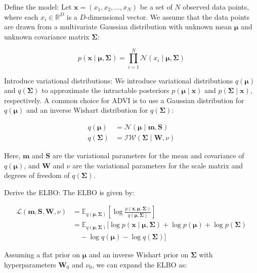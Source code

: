 \documentclass[11pt]{article}
\begin{document}
    Define the model: Let $\mathbf{x} = (x_1, x_2, \ldots, x_N)$ be a set of $N$ observed data points, where each $x_i \in \mathbb{R}^D$ is a $D$-dimensional vector. We assume that the data points are drawn from a multivariate Gaussian distribution with unknown mean $\boldsymbol{\mu}$ and unknown covariance matrix $\boldsymbol{\Sigma}$:

    $$
    p(\mathbf{x} \mid \boldsymbol{\mu}, \boldsymbol{\Sigma}) = \prod_{i=1}^N \mathcal{N}(x_i \mid \boldsymbol{\mu}, \boldsymbol{\Sigma})
    $$

    Introduce variational distributions: We introduce variational distributions $q(\boldsymbol{\mu})$ and $q(\boldsymbol{\Sigma})$ to approximate the intractable posteriors $p(\boldsymbol{\mu} \mid \mathbf{x})$ and $p(\boldsymbol{\Sigma} \mid \mathbf{x})$, respectively. A common choice for ADVI is to use a Gaussian distribution for $q(\boldsymbol{\mu})$ and an inverse Wishart distribution for $q(\boldsymbol{\Sigma})$:

    \begin{align*}
        q(\boldsymbol{\mu}) &= \mathcal{N}(\boldsymbol{\mu} \mid \boldsymbol{m}, \boldsymbol{S}) \\
        q(\boldsymbol{\Sigma}) &= \mathcal{IW}(\boldsymbol{\Sigma} \mid \boldsymbol{W}, \nu)
    \end{align*}

    Here, $\boldsymbol{m}$ and $\boldsymbol{S}$ are the variational parameters for the mean and covariance of $q(\boldsymbol{\mu})$, and $\boldsymbol{W}$ and $\nu$ are the variational parameters for the scale matrix and degrees of freedom of $q(\boldsymbol{\Sigma})$.

    Derive the ELBO: The ELBO is given by:

    \begin{align*}
        \mathcal{L}(\boldsymbol{m}, \boldsymbol{S}, \boldsymbol{W}, \nu) &= \mathbb{E}_{q(\boldsymbol{\mu}, \boldsymbol{\Sigma})} \left[ \log \frac{p(\mathbf{x}, \boldsymbol{\mu}, \boldsymbol{\Sigma})}{q(\boldsymbol{\mu}, \boldsymbol{\Sigma})} \right] \\
        &= \mathbb{E}_{q(\boldsymbol{\mu}, \boldsymbol{\Sigma})} \bigg[ \log p(\mathbf{x} \mid \boldsymbol{\mu}, \boldsymbol{\Sigma}) + \log p(\boldsymbol{\mu}) + \log p(\boldsymbol{\Sigma}) \\
        &\quad - \log q(\boldsymbol{\mu}) - \log q(\boldsymbol{\Sigma}) \bigg]
    \end{align*}

    Assuming a flat prior on $\boldsymbol{\mu}$ and an inverse Wishart prior on $\boldsymbol{\Sigma}$ with hyperparameters $\boldsymbol{W}_0$ and $\nu_0$, we can expand the ELBO as:
\end{document}
